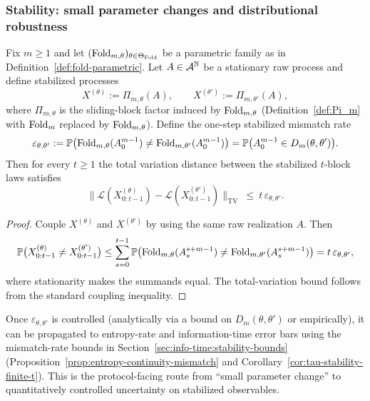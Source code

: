 \subsubsection{Stability: small parameter changes and distributional robustness}\label{sec:stabilization:fold-stability-theta}

\begin{proposition}\label{prop:fold-blocklaw-stability}
Fix $m\ge 1$ and let $(\mathrm{Fold}_{m,\theta})_{\theta\in\Theta_{\mathrm{Fold}}}$ be a parametric family as in Definition~\ref{def:fold-parametric}. Let $A\in\mathcal{A}^{\mathbb{N}}$ be a stationary raw process and define stabilized processes
\[
X^{(\theta)}:=\Pi_{m,\theta}(A),\qquad X^{(\theta')}:=\Pi_{m,\theta'}(A),
\]
where $\Pi_{m,\theta}$ is the sliding-block factor induced by $\mathrm{Fold}_{m,\theta}$ (Definition~\ref{def:Pi_m} with $\mathrm{Fold}_m$ replaced by $\mathrm{Fold}_{m,\theta}$).
Define the one-step stabilized mismatch rate
\[
\varepsilon_{\theta,\theta'}:=\mathbb{P}\bigl(\mathrm{Fold}_{m,\theta}(A_0^{m-1})\neq \mathrm{Fold}_{m,\theta'}(A_0^{m-1})\bigr)=\mathbb{P}\bigl(A_0^{m-1}\in D_m(\theta,\theta')\bigr).
\]
Then for every $t\ge 1$ the total variation distance between the stabilized $t$-block laws satisfies
\[
\bigl\|\mathcal{L}(X^{(\theta)}_{0:t-1})-\mathcal{L}(X^{(\theta')}_{0:t-1})\bigr\|_{\mathrm{TV}}\ \le\ t\,\varepsilon_{\theta,\theta'}.
\]
\end{proposition}

\begin{proof}
Couple $X^{(\theta)}$ and $X^{(\theta')}$ by using the same raw realization $A$. Then
\[
\mathbb{P}\bigl(X^{(\theta)}_{0:t-1}\neq X^{(\theta')}_{0:t-1}\bigr)
\le \sum_{s=0}^{t-1}\mathbb{P}\bigl(\mathrm{Fold}_{m,\theta}(A_s^{s+m-1})\neq \mathrm{Fold}_{m,\theta'}(A_s^{s+m-1})\bigr)
=t\,\varepsilon_{\theta,\theta'},
\]
where stationarity makes the summands equal. The total-variation bound follows from the standard coupling inequality.
\end{proof}

\begin{remark}
Once $\varepsilon_{\theta,\theta'}$ is controlled (analytically via a bound on $D_m(\theta,\theta')$ or empirically), it can be propagated to entropy-rate and information-time error bars using the mismatch-rate bounds in Section~\ref{sec:info-time:stability-bounds} (Proposition~\ref{prop:entropy-continuity-mismatch} and Corollary~\ref{cor:tau-stability-finite-t}). This is the protocol-facing route from ``small parameter change'' to quantitatively controlled uncertainty on stabilized observables.
\end{remark}

